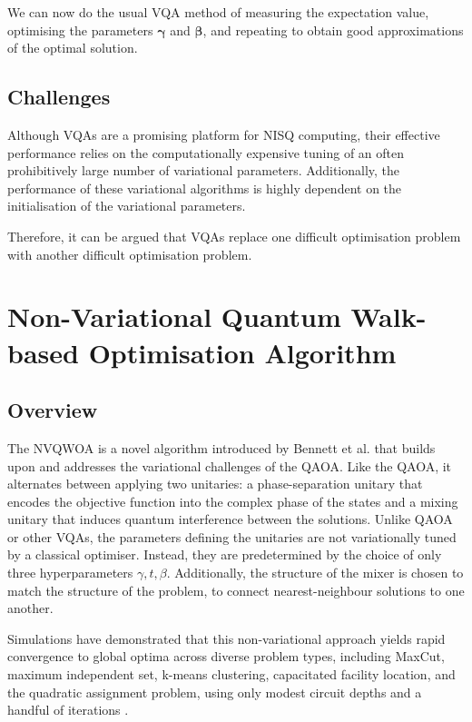 We can now do the usual VQA method of measuring the expectation value, optimising the parameters $\mathbf{\gamma}$ and $\mathbf{\beta}$, and repeating to obtain good approximations of the optimal solution.

\subsection{Challenges}
Although VQAs are a promising platform for NISQ computing, their effective performance relies on the computationally expensive tuning of an often prohibitively large number of variational parameters. Additionally, the performance of these variational algorithms is highly dependent on the initialisation of the variational parameters.

Therefore, it can be argued that VQAs replace one difficult optimisation problem with another difficult optimisation problem.

\section{Non-Variational Quantum Walk-based Optimisation Algorithm}\label{sec:NVQWOA}
\subsection{Overview}
The NVQWOA is a novel algorithm introduced by Bennett et al. that builds upon and addresses the variational challenges of the QAOA\cite{bennett2024nonvariational,bennett2024analysisnonvariationalquantumwalkbased}. 
Like the QAOA, it alternates between applying two unitaries: a phase-separation unitary that encodes the objective function into the complex phase of the states and a mixing unitary that induces quantum interference between the solutions. Unlike QAOA or other VQAs, the parameters defining the unitaries are not variationally tuned by a classical optimiser. Instead, they are predetermined by the choice of only three hyperparameters $\gamma, t, \beta$. Additionally, the structure of the mixer is chosen to match the structure of the problem, to connect nearest-neighbour solutions to one another.

Simulations have demonstrated that this non-variational approach yields rapid convergence to global optima across diverse problem types, including MaxCut, maximum independent set, k-means clustering, capacitated facility location, and the quadratic assignment problem, using only modest circuit depths and a handful of iterations \cite{bennett2024analysisnonvariationalquantumwalkbased}.

